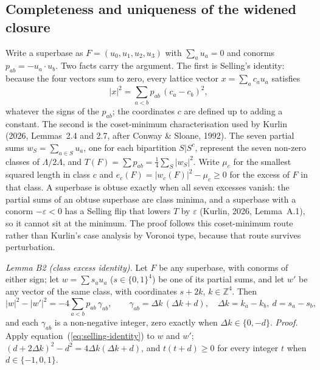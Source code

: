\documentclass[preprint,pdf]{iucr}          %
\begin{document}
\subsection{Completeness and uniqueness of the widened closure}
\label{app:widened-complete}
Write a superbase as $F=(u_0,u_1,u_2,u_3)$ with $\sum_a u_a=0$ and conorms $p_{ab}=-u_a\cdot u_b$. Two facts carry the argument. The first is Selling's identity: because the four vectors sum to zero, every lattice vector $x=\sum_a c_a u_a$ satisfies
\begin{equation}
|x|^2=\sum_{a<b}p_{ab}\,(c_a-c_b)^2 ,
\label{eq:selling-identity}
\end{equation}
whatever the signs of the $p_{ab}$; the coordinates $c$ are defined up to adding a constant. The second is the coset-minimum characterisation used by Kurlin (2026, Lemmas~2.4 and 2.7, after Conway \& Sloane, 1992). The seven partial sums $w_S=\sum_{a\in S}u_a$, one for each bipartition $S|S^c$, represent the seven non-zero classes of $\Lambda/2\Lambda$, and $T(F)=\sum p_{ab}=\frac14\sum_S|w_S|^2$. Write $\mu_c$ for the smallest squared length in class $c$ and $e_c(F)=|w_c(F)|^2-\mu_c\ge0$ for the excess of $F$ in that class. A superbase is obtuse exactly when all seven excesses vanish: the partial sums of an obtuse superbase are class minima, and a superbase with a conorm $-\varepsilon<0$ has a Selling flip that lowers $T$ by $\varepsilon$ (Kurlin, 2026, Lemma~A.1), so it cannot sit at the minimum. The proof follows this coset-minimum route rather than Kurlin's case analysis by Voronoi type, because that route survives perturbation.

\emph{Lemma B2 (class excess identity).} Let $F$ be any superbase, with conorms of either sign; let $w=\sum s_a u_a$ ($s\in\{0,1\}^4$) be one of its partial sums, and let $w'$ be any vector of the same class, with coordinates $s+2k$, $k\in\mathbb Z^4$. Then
\[
|w|^2-|w'|^2=-4\sum_{a<b}p_{ab}\,\gamma_{ab},\qquad
\gamma_{ab}=\Delta k\,(\Delta k+d),\quad \Delta k=k_a-k_b,\ d=s_a-s_b ,
\]
and each $\gamma_{ab}$ is a non-negative integer, zero exactly when $\Delta k\in\{0,-d\}$. \emph{Proof.} Apply equation~(\ref{eq:selling-identity}) to $w$ and $w'$; $(d+2\Delta k)^2-d^2=4\Delta k(\Delta k+d)$, and $t(t+d)\ge0$ for every integer $t$ when $d\in\{-1,0,1\}$.
\end{document}
